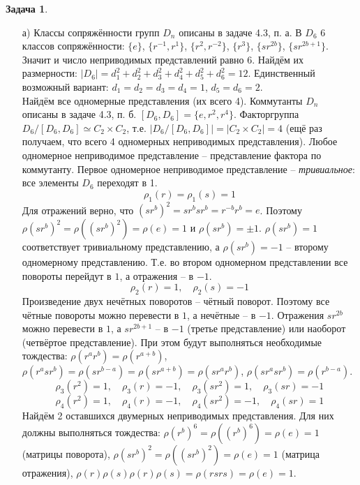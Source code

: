 \documentclass[12pt]{article}
\theoremstyle{definition}
\newtheorem{zad}{Задача}[section]
\begin{document}
\begin{zad}
\begin{itemize}
\item[а)] 
Классы сопряжённости групп $D_n$ описаны в задаче 4.3, п. а. В $D_6$ 6 классов сопряжённости: $\{e\}$, $\{r^{-1},r^1\}$, $\{r^2,r^{-2}\}$, $\{r^3\}$, $\{sr^{2b}\}$, $\{sr^{2b+1}\}$. Значит и число неприводимых представлений равно 6. Найдём их размерности: $|D_6|=d_1^2+d_2^2+d_3^2+d_4^2+d_5^2+d_6^2=12$. Единственный возможный вариант: $d_1=d_2=d_3=d_4=1$, $d_5=d_6=2$.\\
Найдём все одномерные представления (их всего 4). Коммутанты $D_n$ описаны в задаче 4.3, п. б. $[D_6,D_6]=\{e,r^2,r^4\}$. Факторгруппа $D_6/[D_6,D_6]\simeq C_2\times C_2$, т.е. $|D_6/[D_6,D_6]|=|C_2\times C_2|=4$ (ещё раз получаем, что всего 4 одномерных неприводимых представления). Любое одномерное неприводимое представление -- представление фактора по коммутанту. Первое одномерное неприводимое представление -- \textit{тривиальное}: все элементы $D_6$ переходят в 1.
\begin{equation}
    \boxed{\rho_1(r)=\rho_1(s)=1}
\end{equation}
Для отражений верно, что $(sr^b)^2=sr^bsr^b=r^{-b}r^b=e$. Поэтому $\rho(sr^b)^2=\rho((sr^b)^2)=\rho(e)=1$ и $\rho(sr^b)=\pm 1$. $\rho(sr^b)=1$ соответствует тривиальному представлению, а $\rho(sr^b)=-1$ -- второму одномерному представлению. Т.е. во втором одномерном представлении все повороты перейдут в $1$, а отражения -- в $-1$.
\begin{equation}
    \boxed{\rho_2(r)=1,\quad \rho_2(s)=-1}
\end{equation}
Произведение двух нечётных поворотов -- чётный поворот. Поэтому все чётные повороты можно перевести в $1$, а нечётные -- в $-1$. Отражения $sr^{2b}$ можно перевести в $1$, а $sr^{2b+1}$ -- в $-1$ (третье представление) или наоборот (четвёртое представление). При этом будут выполняться необходимые тождества: $\rho(r^ar^b)=\rho(r^{a+b})$, $\rho(r^asr^b)=\rho(sr^{b-a})=\rho(sr^{a+b})=\rho(sr^ar^b)$, $\rho(sr^asr^b)=\rho(r^{b-a})$.
\begin{equation}
    \boxed{\rho_3(r^2)=1,\quad \rho_3(r)=-1,\quad \rho_3(sr^2)=1,\quad \rho_3(sr)=-1}
\end{equation}
\begin{equation}
    \boxed{\rho_4(r^2)=1,\quad \rho_4(r)=-1,\quad \rho_4(sr^2)=-1,\quad \rho_4(sr)=1}
\end{equation}
Найдём 2 оставшихся двумерных неприводимых представления. Для них должны выполняться тождества: $\rho(r^b)^6=\rho((r^b)^6)=\rho(e)=1$ (матрицы поворота), $\rho(sr^b)^2=\rho((sr^b)^2)=\rho(e)=1$ (матрица отражения), $\rho(r)\rho(s)\rho(r)\rho(s)=\rho(rsrs)=\rho(e)=1$.

\end{itemize}
\end{zad}
\end{document}
